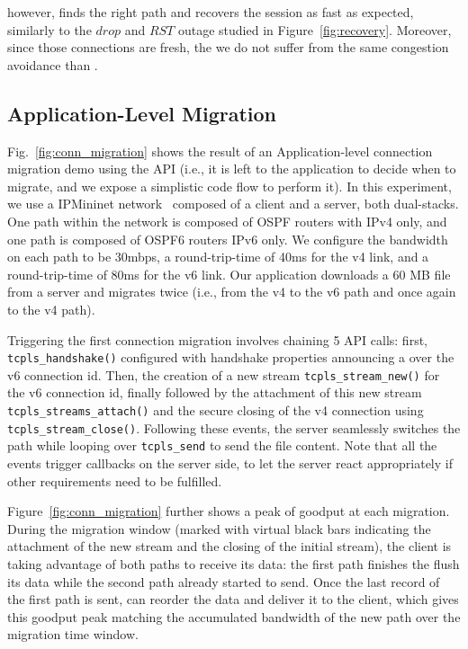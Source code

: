 \tcpls however, finds the right path and recovers the session as fast as
expected, similarly to the $drop$ and $RST$ outage studied in Figure~\ref{fig:recovery}.
Moreover, since those connections are fresh, the we do not suffer from the same
congestion avoidance than \mptcp.

\subsection{Application-Level Migration}

Fig.~\ref{fig:conn_migration} shows the result of an Application-level
connection migration demo using the API (i.e., it is left to the application to
decide when to migrate, and we expose a simplistic code flow to perform it). In
this experiment, we use a IPMininet network~\cite{ipmininet,
  jadin2020educational} composed of a client and a server, both
dual-stacks. One path within the network is composed of OSPF routers with IPv4
only, and one path is composed of OSPF6 routers IPv6 only. We configure the
bandwidth on each path to be 30mbps, a round-trip-time of 40ms for the v4 link,
and a round-trip-time of 80ms for the v6 link. Our application downloads
a 60 MB file from a server and migrates twice (i.e., from the v4 to the v6 path
and once again to the v4 path).

Triggering the first connection migration involves chaining 5 API calls: first,
\texttt{tcpls\_handshake()} configured with handshake properties announcing a
\join over the v6 connection id. Then, the creation of a new stream
\texttt{tcpls\_stream\_new()} for the v6 connection id, finally followed by the
attachment of this new stream \texttt{tcpls\_streams\_attach()} and the secure
closing of the v4 \tcp connection using \texttt{tcpls\_stream\_close()}.
Following these events, the server seamlessly switches the path while looping
over \texttt{tcpls\_send} to send the file content. Note that all the events
trigger callbacks on the server side, to let the server react appropriately if
other requirements need to be fulfilled.

Figure~\ref{fig:conn_migration} further shows a peak of goodput at each
migration. During the migration window (marked with virtual black bars
indicating the attachment of the new stream and the closing of the initial
stream), the client is taking advantage of both paths to receive its data: the
first path finishes the flush its data while the second path already started to
send. Once the last record of the first path is sent, \tcpls can reorder the
data and deliver it to the client, which gives this goodput peak matching the
accumulated bandwidth of the new path over the migration time window.

